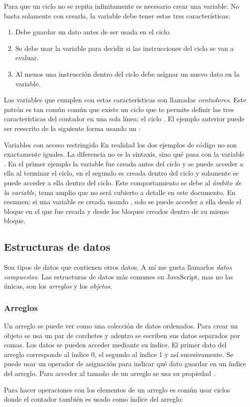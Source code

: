 \documentclass{article}
\newcommand{\code}[1]{\tcbox{\texttt{#1}}}
\newcommand{\codejs}[1]{\tcbox{\lstinline[style=ES6]{#1}}}
\newcommand{\jsfile}[2]{}
\newenvironment{info}[1]
  {\begin{bclogo}[logo=\bcinfo, couleurBarre=orange, noborder=true, couleur=white]{#1}}
  {\end{bclogo}}
\begin{document}
Para que un ciclo no se repita infinitamente es necesario crear una variable. No basta solamente con crearla, la variable debe tener estas tres características:
\begin{enumerate}
  \item Debe guardar un dato antes de ser usada en el ciclo.
  \item Se debe usar la variable para decidir si las instrucciones del ciclo se van a evaluar.
  \item Al menos una instrucción dentro del ciclo debe asignar un nuevo dato en la variable.
\end{enumerate}
Las variables que cumplen con estas características son llamadas \textit{contadores}. Este patrón es tan común común que existe un ciclo que te permite definir las tres características del contador en una sola línea: el ciclo \codejs{for}. El ejemplo anterior puede ser reescrito de la siguiente forma usando un \codejs{for}:
\jsfile{Ciclo finito usando \codejs{for}}{code/cicles/for.js}
\begin{info}{Variables con acceso restringido}
En realidad los dos ejemplos de código no son exactamente iguales. La diferencia no es la sintaxis, sino qué pasa con la variable \codejs{número}. En el primer ejemplo la variable fue creada antes del ciclo \codejs{while} y se puede acceder a ella al terminar el ciclo, en el segundo es creada dentro del ciclo \codejs{for} y solamente se puede acceder a ella dentro del ciclo. Este comportamiento se debe al \textit{ámbito de la variable}\cite{scope}, tema amplio que no será cubierto a detalle en este documento. En resumen: si una variable es creada usando \codejs{let}, solo se puede acceder a ella desde el bloque en el que fue creada y desde los bloques creados dentro de su mismo bloque.
\end{info}


\subsection{Estructuras de datos}
Son tipos de datos que contienen otros datos. A mí me gusta llamarlos \textit{datos compuestos}. Las estructuras de datos más comunes en JavaScript, mas no las únicas, son los \textit{arreglos} y los \textit{objetos}.
\subsubsection{Arreglos}
Un arreglo se puede ver como una colección de datos ordenados. Para crear un objeto se usa un par de corchetes \codejs{[ ]} y adentro se escriben sus datos separados por comas. Los datos se pueden acceder mediante su índice. El primer dato del arreglo corresponde al índice 0, el segundo al índice 1 y así sucesivamente. Se puede usar un operador de asignación para indicar qué dato guardar en un índice del arreglo. Para acceder al tamaño de un arreglo se usa su propiedad \code{length}.
\jsfile{Crear, acceder y modificar un arreglo}{code/data-structures/arrays.js}
Para hacer operaciones con los elementos de un arreglo es común usar ciclos donde el contador también es usado como índice del arreglo:
\jsfile{Ciclar un arreglo}{code/data-structures/arrays-in-for.js}
\end{document}
